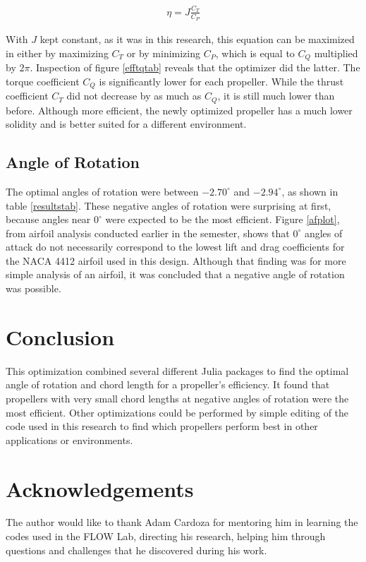 \documentclass[journal ]{new-aiaa}
\begin{document}
\begin{equation}
	\begin{aligned}
	\label{etqeq}
	\eta = J \frac{C_{T}}{C_{P}}
	\end{aligned}
\end{equation}

With $J$ kept constant, as it was in this research, this equation can be maximized in either by maximizing $C_{T}$ or by minimizing $C_{P}$, which is equal to $C_{Q}$ multiplied by $2 \pi$. Inspection of figure \ref{efftqtab} reveals that the optimizer did the latter. The torque coefficient $C_{Q}$ is significantly lower for each propeller. While the thrust coefficient $C_{T}$ did not decrease by as much as $C_{Q}$, it is still much lower than before. Although more efficient, the newly optimized propeller has a much lower solidity and is better suited for a different environment.

\subsection{Angle of Rotation}

The optimal angles of rotation were between $-2.70^{\circ}$ and $-2.94^{\circ}$, as shown in table \ref{resultstab}. These negative angles of rotation were surprising at first, because angles near $0^{\circ}$ were expected to be the most efficient. Figure \ref{afplot}, from airfoil analysis conducted earlier in the semester, shows that $0^{\circ}$ angles of attack do not necessarily correspond to the lowest lift and drag coefficients for the NACA 4412 airfoil used in this design. Although that finding was for more simple analysis of an airfoil, it was concluded that a negative angle of rotation was possible.

\section{Conclusion}

This optimization combined several different Julia packages to find the optimal angle of rotation and chord length for a propeller's efficiency. It found that propellers with very small chord lengths at negative angles of rotation were the most efficient. Other optimizations could be performed by simple editing of the code used in this research to find which propellers perform best in other applications or environments. 


\section{Acknowledgements}

The author would like to thank Adam Cardoza for mentoring him in learning the codes used in the FLOW Lab, directing his research, helping him through questions and challenges that he discovered during his work.




\end{document}

